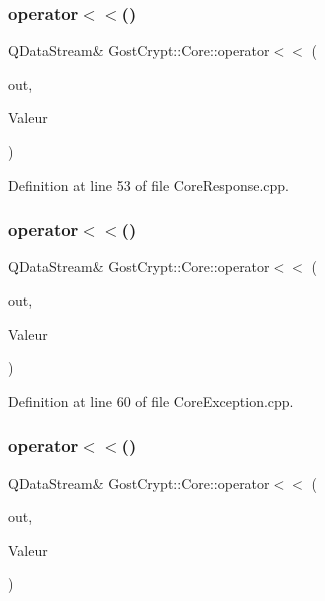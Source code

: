\subsubsection{\texorpdfstring{operator$<$$<$()}{operator<<()}\hspace{0.1cm}{\footnotesize\ttfamily [7/56]}}
{\footnotesize\ttfamily Q\+Data\+Stream\& Gost\+Crypt\+::\+Core\+::operator$<$$<$ (\begin{DoxyParamCaption}\item[{Q\+Data\+Stream \&}]{out,  }\item[{const \hyperlink{struct_gost_crypt_1_1_core_1_1_backup_header_response}{Backup\+Header\+Response} \&}]{Valeur }\end{DoxyParamCaption})}



Definition at line 53 of file Core\+Response.\+cpp.

\mbox{\label{namespace_gost_crypt_1_1_core_a17203e9ea75c928df852cc42a0ae3dfb}} 
\subsubsection{\texorpdfstring{operator$<$$<$()}{operator<<()}\hspace{0.1cm}{\footnotesize\ttfamily [8/56]}}
{\footnotesize\ttfamily Q\+Data\+Stream\& Gost\+Crypt\+::\+Core\+::operator$<$$<$ (\begin{DoxyParamCaption}\item[{Q\+Data\+Stream \&}]{out,  }\item[{const \hyperlink{class_gost_crypt_1_1_core_1_1_volume_already_mounted}{Gost\+Crypt\+::\+Core\+::\+Volume\+Already\+Mounted} \&}]{Valeur }\end{DoxyParamCaption})}



Definition at line 60 of file Core\+Exception.\+cpp.

\mbox{\label{namespace_gost_crypt_1_1_core_a895b7f5d0e21d951476ebe909aadcc10}} 
\subsubsection{\texorpdfstring{operator$<$$<$()}{operator<<()}\hspace{0.1cm}{\footnotesize\ttfamily [9/56]}}
{\footnotesize\ttfamily Q\+Data\+Stream\& Gost\+Crypt\+::\+Core\+::operator$<$$<$ (\begin{DoxyParamCaption}\item[{Q\+Data\+Stream \&}]{out,  }\item[{const \hyperlink{struct_gost_crypt_1_1_core_1_1_restore_header_response}{Restore\+Header\+Response} \&}]{Valeur }\end{DoxyParamCaption})}



